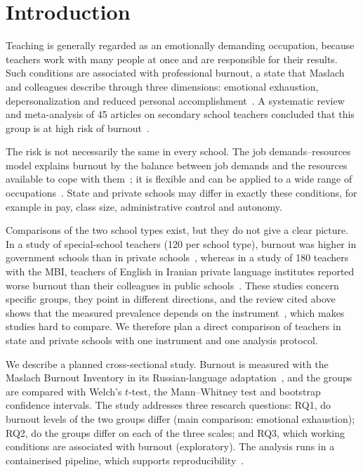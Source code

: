 \section{Introduction}\label{sec:intro}

Teaching is generally regarded as an emotionally demanding occupation, because
teachers work with many people at once and are responsible for their results.
Such conditions are associated with professional burnout, a state that Maslach
and colleagues describe through three dimensions: emotional exhaustion,
depersonalization and reduced personal accomplishment~\cite{maslach1981mbi,maslach2001job}.
A systematic review and meta-analysis of 45 articles on secondary school
teachers concluded that this group is at high risk of burnout~\cite{garciacarmona2019burnout}.

The risk is not necessarily the same in every school. The job
demands--resources model explains burnout by the balance between job demands
and the resources available to cope with them~\cite{demerouti2001jdr,bakker2007jdr};
it is flexible and can be applied to a wide range of occupations~\cite{bakker2007jdr}.
State and private schools may differ in exactly these conditions, for example
in pay, class size, administrative control and autonomy.

Comparisons of the two school types exist, but they do not give a clear
picture. In a study of special-school teachers (120 per school type), burnout was
higher in government schools than in private schools~\cite{doss2018special},
whereas in a study of 180 teachers with the MBI, teachers of English in Iranian
private language institutes reported worse burnout than their colleagues in
public schools~\cite{bahrami2019efl}. These
studies concern specific groups, they point in different directions, and the
review cited above shows that the measured prevalence depends on the
instrument~\cite{garciacarmona2019burnout}, which makes studies hard to
compare. We therefore plan a direct comparison of teachers in state and
private schools with one instrument and one analysis protocol.

We describe a planned cross-sectional study. Burnout is measured with the
Maslach Burnout Inventory in its Russian-language adaptation~\cite{vodopyanova2008burnout},
and the groups are compared with Welch's $t$-test, the Mann--Whitney test and
bootstrap confidence intervals. The study addresses three research questions:
RQ1, do burnout levels of the two groups differ (main comparison: emotional
exhaustion); RQ2, do the groups differ on each of the three scales; and RQ3,
which working conditions are associated with burnout (exploratory). The
analysis runs in a containerised pipeline, which supports reproducibility~\cite{boettiger2015docker}.

